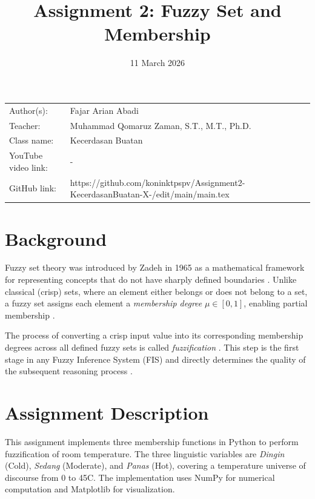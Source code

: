\documentclass{article}
\title{Assignment 2: Fuzzy Set and Membership}
\date{11 March 2026}
\begin{document}
\maketitle

\noindent\begin{tabular}{@{}ll}
    Author(s):          & Fajar Arian Abadi \\
    Teacher:            & Muhammad Qomaruz Zaman, S.T., M.T., Ph.D. \\
    Class name:         & Kecerdasan Buatan \\
    YouTube video link: & - \\
    GitHub link:        & https://github.com/koninktpspv/Assignment2-KecerdasanBuatan-X-/edit/main/main.tex
\end{tabular}
\vspace{1cm}

\section*{Background}

Fuzzy set theory was introduced by Zadeh in 1965 as a mathematical framework
for representing concepts that do not have sharply defined boundaries
\cite{zadeh1965fuzzy}. Unlike classical (crisp) sets, where an element either
belongs or does not belong to a set, a fuzzy set assigns each element a
\textit{membership degree} $\mu \in [0, 1]$, enabling partial membership
\cite{ross2016fuzzy}.

The process of converting a crisp input value into its corresponding membership
degrees across all defined fuzzy sets is called \textit{fuzzification}
\cite{yen1999fuzzy}. This step is the first stage in any Fuzzy Inference System
(FIS) and directly determines the quality of the subsequent reasoning process
\cite{mamdani1974application}.

\section*{Assignment Description}

This assignment implements three membership functions in Python to perform
fuzzification of room temperature. The three linguistic variables are
\textit{Dingin} (Cold), \textit{Sedang} (Moderate), and \textit{Panas} (Hot),
covering a temperature universe of discourse from 0 to 45\textdegree C. The
implementation uses NumPy \cite{harris2020numpy} for numerical computation and
Matplotlib \cite{hunter2007matplotlib} for visualization.
\end{document}
